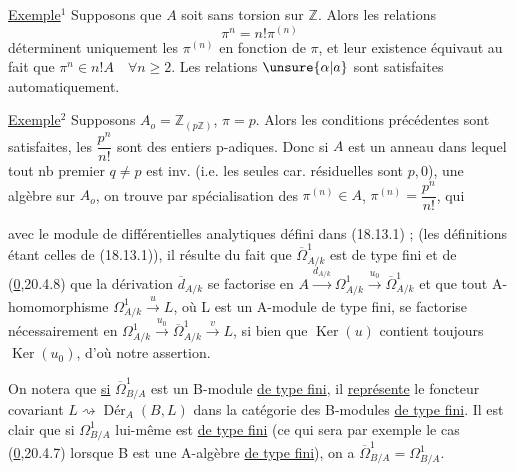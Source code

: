 \uline{Exemple$^1$} Supposons que $A$ soit sans torsion sur $\mathbb Z$. Alors les  relations
\[
\pi^n=n!\pi^{(n)}
\]
déterminent uniquement les $\pi^{(n)}$ en fonction de $\pi$, et leur existence équivaut au fait que $\pi^n\in n!A\quad\forall n\geq2$. Les relations $\unsure{\alpha|a}$ sont satisfaites automatiquement.

\uline{Exemple$^2$} Supposons $A_o=\mathbb Z_{(p\mathbb Z)}$,  $\pi=p$. Alors les conditions précédentes sont satisfaites,
les $\dfrac{p^n}{n!}$ sont des entiers p-adiques. Donc si $A$ est un anneau dans lequel tout nb premier $q\ne p$ est inv. (i.e. les seules car. résiduelles sont $p,0$),  une algèbre sur $A_o$, on trouve par spécialisation des $\pi^{(n)}\in A$, $\pi^{(n)}=\dfrac{p^n}{n!}$, qui



 avec le module de différentielles analytiques défini dans (18.13.1) ;   (les définitions étant celles de (18.13.1)), il résulte du fait que $\overline{\Omega}^{1}_{A/k}$ est de type fini  et de (\uline{0},20.4.8) que  la dérivation $\overline{d}_{A/k}$ se factorise en  $A\xrightarrow{d_{A/k}}\Omega^1_{A/k}\xrightarrow{u_0}\overline{\Omega}^1_{A/k}$ et que tout A-homomorphisme  $\Omega^1_{A/k}\xrightarrow{u}L$, où L est un A-module de type fini, se factorise nécessairement en $\Omega^1_{A/k}\xrightarrow{u_0}\overline{\Omega}^1_{A/k}\xrightarrow{v}L$, si bien que $\operatorname{Ker}(u)$ contient toujours $\operatorname{Ker}(u_0)$, d'où notre assertion.

On notera que \uline{si} $\overline{\Omega}^1_{B/A}$ est un B-module \uline{de type fini}, il \uline{représente} le foncteur covariant $L\rightsquigarrow\operatorname{Dér}_A(B,L)$ dans la catégorie des B-modules \uline{de type fini}.  Il est clair que si $\Omega^1_{B/A}$ lui-même est \uline{de type fini} (ce qui sera par exemple le cas (\uline{0},20.4.7) lorsque B est une A-algèbre \uline{de type fini}), on a $\overline{\Omega}^1_{B/A}=\Omega^1_{B/A}$.

